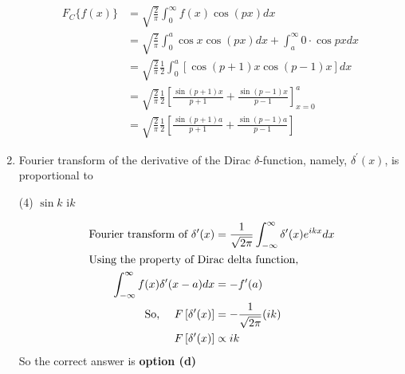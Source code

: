 \begin{enumerate}
\begin{answer}
	\begin{align*}
	F_{C}\{f(x)\} &=\sqrt{\frac{2}{\pi}} \int_{0}^{\infty} f(x) \cos (p x) d x \\
	&=\sqrt{\frac{2}{\pi}} \int_{0}^{a} \cos x \cos (p x) d x+\int_{a}^{\infty} 0 \cdot \cos p x d x \\
	&=\sqrt{\frac{2}{\pi}} \frac{1}{2} \int_{0}^{a}[\cos (p+1) x \cos (p-1) x] d x\\
	&=\sqrt{\frac{2}{\pi}} \frac{1}{2}\left[\frac{\sin (p+1) x}{p+1}+\frac{\sin (p-1) x}{p-1}\right]_{x=0}^{a} \\
	&=\sqrt{\frac{2}{\pi}} \frac{1}{2}\left[\frac{\sin (p+1) a}{p+1}+\frac{\sin (p-1) a}{p-1}\right]
	\end{align*}
\end{answer}

\item	Fourier transform of the derivative of the Dirac $\delta$-function, namely, $\delta^{\prime}(x)$, is proportional to
	\begin{tasks}(4)
		\task[\textbf{c.}] $\sin k$
		\task[\textbf{d.}] $\mathrm{i} k$
	\end{tasks}

\begin{answer}
	\begin{align*}
	\text { Fourier transform of } \delta^{\prime}(x)&=\frac{1}{\sqrt{2 \pi}} \int_{-\infty}^{\infty} \delta^{\prime}(x) e^{i k x} d x\\
	\intertext { Using the property of Dirac delta function, } \int_{-\infty}^{\infty} f(x) \delta^{\prime}(x-a) d x&=-f^{\prime}(a)\\
	\text { So, } \quad F\left[\delta^{\prime}(x)\right]&=-\frac{1}{\sqrt{2 \pi}}(i k)  \\ F\left[\delta^{\prime}(x)\right] &\propto i k
	\end{align*}
	So the correct answer is \textbf{option (d)}
\end{answer}
\end{enumerate}